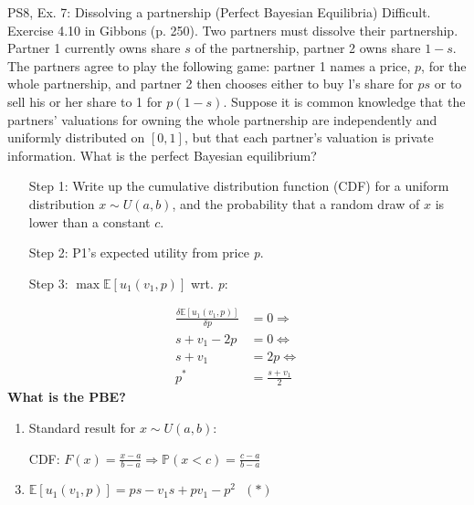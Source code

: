 \begin{frame}{PS8, Ex. 7: Dissolving a partnership (Perfect Bayesian Equilibria)}
    Difficult. Exercise 4.10 in Gibbons (p. 250). Two partners must dissolve their partnership. Partner 1 currently owns share $s$ of the partnership, partner 2 owns share $1-s$. The partners agree to play the following game: partner 1 names a price, $p$, for the whole partnership, and partner 2 then chooses either to buy l's share for $ps$ or to sell his or her share to 1 for $p(1-s)$. Suppose it is common knowledge that the partners' valuations for owning the whole partnership are independently and uniformly distributed on $[0,1]$, but that each partner's valuation is private information. What is the perfect Bayesian equilibrium?\vspace{-11pt}
    \begin{multicols}{2}
      \begin{itemize}
        \item[Step 1:] Write up the cumulative distribution function (CDF) for a uniform distribution $x\sim U(a, b)$, and the probability that a random draw of $x$ is lower than a constant $c$.
        \item[Step 2:] P1's expected utility from price \textit{p}.
        \item[Step 3:] $\max\mathbb{E}[u_1(v_1,p)]$ wrt. \textit{p}:
      \end{itemize}\vspace{-6pt}
      \begin{align*}
        \frac{\delta \mathbb{E}[u_1(v_1,p)]}{\delta p}&=0\Rightarrow\\
        s+v_1-2p&=0\Leftrightarrow\\
        s+v_1&=2p\Leftrightarrow\\
        p^*&=\frac{s+v_1}{2}
      \end{align*}
      \textbf{What is the PBE?}
      \vfill\null\columnbreak
      \begin{enumerate}
        \item Standard result for $x\sim U(a, b):$
        \item[CDF:] $F(x)=\frac{x-a}{b-a}\Rightarrow\mathbb{P}(x<c)=\frac{c-a}{b-a}$
        \item $\mathbb{E}[u_1(v_1,p)]=ps-v_1s+pv_1-p^2\ \ \ (*)$
      \end{enumerate}
      \vfill\null
    \end{multicols}
\end{frame}
